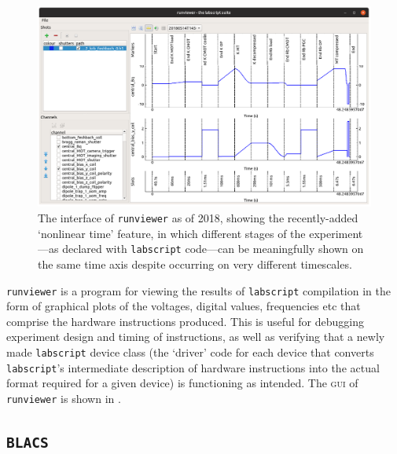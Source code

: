 \begin{figure}[t]
\begin{center}
\includegraphics[width=\textwidth]{figures/software/new_screenshots/runviewer.png}
\caption{The interface of \texttt{runviewer} as of 2018, showing the recently-added `nonlinear time' feature, in which different stages of the experiment---as declared with \texttt{labscript} code---can be meaningfully shown on the same time axis despite occurring on very different timescales.}\label{fig:runviewer}
\end{center}
\end{figure}

\texttt{runviewer} is a program for viewing the results of \texttt{labscript} compilation in the form of graphical plots of the voltages, digital values, frequencies etc that comprise the hardware instructions produced. This is useful for debugging experiment design and timing of instructions, as well as verifying that a newly made \texttt{labscript} device class (the `driver' code for each device that converts \texttt{labscript}'s intermediate description of hardware instructions into the actual format required for a given device) is functioning as intended. The \textsc{gui} of \texttt{runviewer} is shown in .

\subsection{\texttt{BLACS}}

